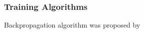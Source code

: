 \subsubsection{Training Algorithms}
Backpropagation algorithm was proposed by~\citet{werbos1975beyond}